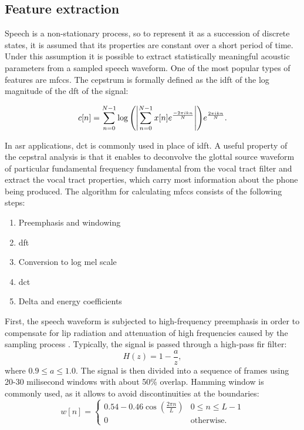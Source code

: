 \subsection{Feature extraction}
\label{subsection:features}
Speech is a non-stationary process, so to represent it as a succession of discrete states, it is assumed that its properties are constant over a short period of time. Under this assumption it is possible to extract statistically meaningful acoustic parameters from a sampled speech waveform. One of the most popular types of features are \glspl{mfcc}. The cepstrum is formally defined as the \gls{idft} of the log magnitude of the \gls{dft} of the signal: 

\begin{equation}
	\label{equation:cepstrum}
	c[n]=\sum_{n=0}^{N-1}\log{\left(\left|\sum_{n=0}^{N-1}x[n]e^{\frac{-2\pi ikn}{N}}\right|\right)}e^{\frac{2\pi ikn}{N}}.
\end{equation}

In \gls{asr} applications, \gls{dct} is commonly used in place of \gls{idft}. A useful property of the cepstral analysis is that it enables to deconvolve the glottal source waveform of particular fundamental frequency \gls{fundamental} from the vocal tract filter and extract the vocal tract properties, which carry most information about the phone being produced. The algorithm for calculating \glspl{mfcc} consists of the following steps:
\begin{enumerate}
	\item Preemphasis and windowing
	\item \gls{dft}
	\item Conversion to log mel scale 
	\item \gls{dct}
	\item Delta and energy coefficients
\end{enumerate}

First, the speech waveform is subjected to high-frequency preemphasis in order to compensate for lip radiation and attenuation of high frequencies caused by the sampling process \cite{singh2012preprocessing}. Typically, the signal is passed through a high-pass \gls{fir} filter:
\begin{equation}
H(z)=1-\frac{a}{z},
\end{equation}
where $0.9 \leq a \leq 1.0$. The signal is then divided into a sequence of frames using 20-30 milisecond windows with about 50\% overlap. Hamming window is commonly used, as it allows to avoid discontinuities at the boundaries:
\begin{equation}
\label{equation:hamming}
  w[n]=
  \begin{cases}
    0.54-0.46\cos(\frac{2 \pi n}{L}) & 0 \leq n \leq L-1 \\
    0                               & \text{otherwise.}
  \end{cases}
\end{equation}


